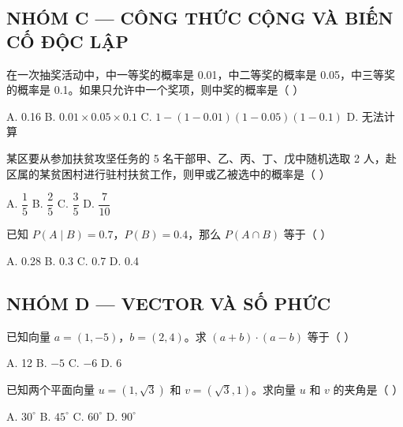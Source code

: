 \documentclass[11pt, a4paper]{article}
\begin{document}
\subsection*{NHÓM C — CÔNG THỨC CỘNG VÀ BIẾN CỐ ĐỘC LẬP}

\begin{baitap}[11]
在一次抽奖活动中，中一等奖的概率是 0.01，中二等奖的概率是 0.05，中三等奖的概率是 0.1。如果只允许中一个奖项，则中奖的概率是（ ）
\par\vspace{3pt}
\noindent A. 0.16 \quad B. $0.01 \times 0.05 \times 0.1$ \quad C. $1 - (1 - 0.01)(1 - 0.05)(1 - 0.1)$ \quad D. 无法计算
\end{baitap}

\begin{baitap}[12]
某区要从参加扶贫攻坚任务的 5 名干部甲、乙、丙、丁、戊中随机选取 2 人，赴区属的某贫困村进行驻村扶贫工作，则甲或乙被选中的概率是（ ）
\par\vspace{3pt}
\noindent A. $\dfrac{1}{5}$ \quad B. $\dfrac{2}{5}$ \quad C. $\dfrac{3}{5}$ \quad D. $\dfrac{7}{10}$
\end{baitap}

\begin{baitap}[13]
已知 $P(A\mid B)=0.7$，$P(B)=0.4$，那么 $P(A\cap B)$ 等于（ ）
\par\vspace{3pt}
\noindent A. 0.28 \quad B. 0.3 \quad C. 0.7 \quad D. 0.4
\end{baitap}

\subsection*{NHÓM D — VECTOR VÀ SỐ PHỨC}

\begin{baitap}[14]
已知向量 $a=(1,-5)$，$b=(2,4)$。求 $(a+b)\cdot(a-b)$ 等于（ ）
\par\vspace{3pt}
\noindent A. 12 \quad B. $-5$ \quad C. $-6$ \quad D. 6
\end{baitap}

\begin{baitap}[15]
已知两个平面向量 $u=(1,\sqrt{3})$ 和 $v=(\sqrt{3},1)$。求向量 $u$ 和 $v$ 的夹角是（ ）
\par\vspace{3pt}
\noindent A. $30^\circ$ \quad B. $45^\circ$ \quad C. $60^\circ$ \quad D. $90^\circ$
\end{baitap}
\end{document}
